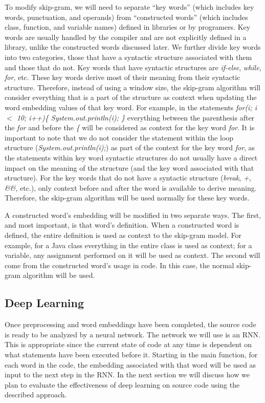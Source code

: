 To modify skip-gram, we will need to separate ``key words'' (which includes key words, punctuation, and operands) from ``constructed words'' (which includes class, function, and variable names) defined in libraries or by programers. Key words are usually handled by the compiler and are not explicitly defined in a library, unlike the constructed words discussed later. We further divide key words into two categories, those that have a syntactic structure associated with them and those that do not. Key words that have syntactic structures are \textit{if-else}, \textit{while}, \textit{for}, etc. These key words derive most of their meaning from their syntactic structure. Therefore, instead of using a window size, the skip-gram algorithm will consider everything that is a part of the structure as context when updating the word embedding values of that key word. For example, in the statements \textit{for(i; i $<$ 10; i++)\{ System.out.println(i); \}} everything between the parenthesis after the \textit{for} and before the \textit{\{} will be considered as context for the key word \textit{for}. It is important to note that we do not consider the statement within the loop structure (\textit{System.out.println(i);}) as part of the context for the key word \textit{for}, as the statements within key word syntactic structures do not usually have a direct impact on the meaning of the structure (and the key word associated with that structure). For the key words that do not have a syntactic structure (\textit{break}, \textit{+}, \textit{\&\&}, etc.), only context before and after the word is available to derive meaning. Therefore, the skip-gram algorithm will be used normally for these key words.

A constructed word's embedding will be modified in two separate ways. The first, and most important, is that word's definition. When a constructed word is defined, the entire definition is used as context to the skip-gram model. For example, for a Java class everything in the entire class is used as context; for a variable, any assignment performed on it will be used as context. The second will come from the constructed word's usage in code. In this case, the normal skip-gram algorithm will be used.

\subsection{Deep Learning}

Once preprocessing and word embeddings have been completed, the source code is ready to be analyzed by a neural network. The network we will use is an RNN. This is appropriate since the current state of code at any time is dependent on what statements have been executed before it. Starting in the main function, for each word in the code, the embedding associated with that word will be used as input to the next step in the RNN. In the next section we will discuss how we plan to evaluate the effectiveness of deep learning on source code using the described approach.




